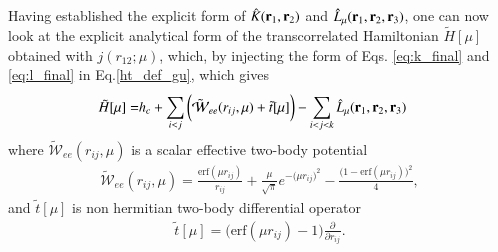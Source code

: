 \documentclass[aip,jcp,reprint,noshowkeys,superscriptaddress]{revtex4-1}
\newcommand{\deriv}[3]{\frac{\partial^{#3} #1}{\partial {#2}^{#3}}}
\newcommand{\bri}[1]{{\bf r}_{#1}}
\begin{document}
Having established the explicit form of $\hat{K}(\bri{1},\bri{2})$ and $\hat{L}_\mu(\bri{1},\bri{2},\bri{3})$, one can now 
look at the explicit analytical form of the transcorrelated Hamiltonian $\tilde{H}[\mu]$ obtained with $j(r_{12};\mu)$,  
which, by injecting the form of Eqs. \eqref{eq:k_final} and \eqref{eq:l_final} in Eq.\eqref{ht_def_gu}, which gives
\begin{equation}
  \begin{aligned}
 \label{eq:exp_ht_mu}
   \tilde{H}[\mu] = & h_c + \sum_{i<j} \bigg( \tilde{\mathcal{W}}_{ee}(r_{ij},\mu) + \tilde{t}[\mu] \bigg) - \sum_{i<j<k} \hat{L}_\mu(\bri{1},\bri{2},\bri{3})
  \end{aligned}
\end{equation}
where $ \tilde{\mathcal{W}}_{ee}(r_{ij},\mu)$ is a scalar effective two-body potential
\begin{equation}
 \begin{aligned}
 \tilde{\mathcal{W}}_{ee}(r_{ij},\mu)  =  \frac{\text{erf}(\mu r_{ij})}{r_{ij}} + \frac{\mu}{\sqrt{\pi}} e^{-\big(\mu r_{ij} \big)^2} - \frac{\bigg(1 -     \text{erf}(\mu r_{ij}) \bigg)^2}{4}, 
 \end{aligned}
\end{equation}
and $\tilde{t}[\mu]$ is non hermitian two-body differential operator 
\begin{equation}
 \begin{aligned}
 \tilde{t}[\mu] =  \bigg( \text{erf}(\mu r_{ij}) - 1\bigg) \deriv{}{r_{ij}}{}.
 \end{aligned}
\end{equation}
\end{document}
